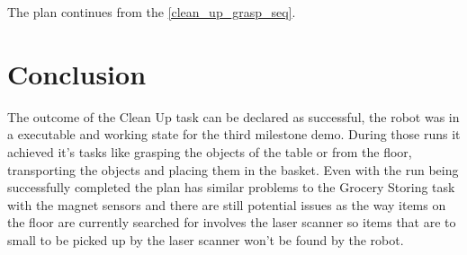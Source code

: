 \documentclass[main.tex]{subfiles}
\begin{document}
    The plan continues from the \ref{clean_up_grasp_seq}.
    
    
	\section{Conclusion}
	The outcome of the Clean Up task can be declared as successful, the robot was in a executable and working state for the third milestone demo. During those runs it achieved it's tasks like grasping the objects of the table or from the floor, transporting the objects and placing them in the basket.
	Even with the run being successfully completed the plan has similar problems to the Grocery Storing task with the magnet sensors and there are still potential issues as the way items on the floor are currently searched for involves the laser scanner so items that are to small to be picked up by the laser scanner won't be found by the robot.
	\endgroup
\end{document}
